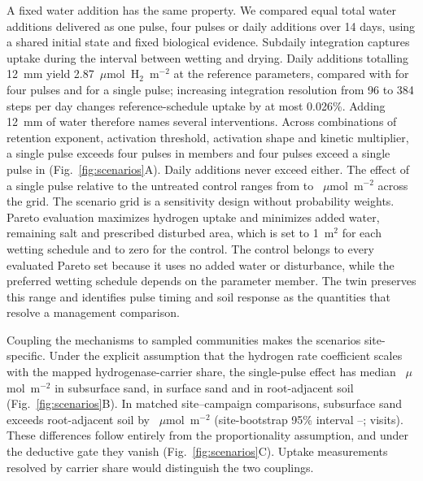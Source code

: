 \documentclass[11pt,a4paper]{article}
\begin{document}
A fixed water addition has the same property. We compared equal total water additions delivered as one pulse, four pulses or daily additions over 14 days, using a shared initial state and fixed biological evidence. Subdaily integration captures uptake during the interval between wetting and drying. Daily additions totalling 12~mm yield 2.87~$\mu$mol~H$_2$~m$^{-2}$ at the reference parameters, compared with \RefHtwoFour{} for four pulses and \RefHtwoSingle{} for a single pulse; increasing integration resolution from 96 to 384 steps per day changes reference-schedule uptake by at most 0.026\%. Adding 12~mm of water therefore names several interventions. Across \VersionMembers{} combinations of retention exponent, activation threshold, activation shape and kinetic multiplier, a single pulse exceeds four pulses in \VersionSingleFirst{} members and four pulses exceed a single pulse in \VersionFourFirst{} (Fig.~\ref{fig:scenarios}A). Daily additions never exceed either. The effect of a single pulse relative to the untreated control ranges from \VersionEffectSingleLow{} to \VersionEffectSingleHigh{}~$\mu$mol~m$^{-2}$ across the grid. The scenario grid is a sensitivity design without probability weights. Pareto evaluation maximizes hydrogen uptake and minimizes added water, remaining salt and prescribed disturbed area, which is set to 1~m$^2$ for each wetting schedule and to zero for the control. The control belongs to every evaluated Pareto set because it uses no added water or disturbance, while the preferred wetting schedule depends on the parameter member. The twin preserves this range and identifies pulse timing and soil response as the quantities that resolve a management comparison.

Coupling the mechanisms to sampled communities makes the scenarios site-specific. Under the explicit assumption that the hydrogen rate coefficient scales with the mapped hydrogenase-carrier share, the single-pulse effect has median \HtwoPropSingleMedianDeep{}~$\mu$mol~m$^{-2}$ in subsurface sand, \HtwoPropSingleMedianSurface{} in surface sand and \HtwoPropSingleMedianRoot{} in root-adjacent soil (Fig.~\ref{fig:scenarios}B). In matched site--campaign comparisons, subsurface sand exceeds root-adjacent soil by \ContrastDeepRootEst{}~$\mu$mol~m$^{-2}$ (site-bootstrap 95\% interval \ContrastDeepRootLow{}--\ContrastDeepRootHigh{}; \ContrastDeepRootVisits{} visits). These differences follow entirely from the proportionality assumption, and under the deductive gate they vanish (Fig.~\ref{fig:scenarios}C). Uptake measurements resolved by carrier share would distinguish the two couplings.
\end{document}
